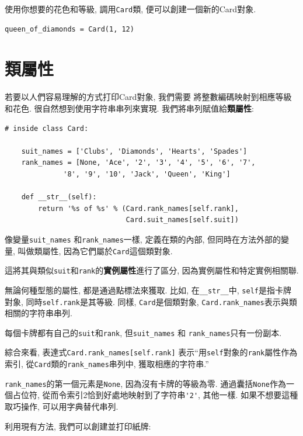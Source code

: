 \documentclass[10pt]{book}
\begin{document}
使用你想要的花色和等級, 調用{\tt Card}類, 便可以創建一個新的Card對象. 

\begin{verbatim}
queen_of_diamonds = Card(1, 12)
\end{verbatim}
%


\section{類屬性}
\label{class.attribute}

若要以人們容易理解的方式打印Card對象, 我們需要
將整數編碼映射到相應等級和花色. 
很自然想到使用字符串串列來實現. 
我們將串列賦值給{\bf 類屬性}:

\begin{verbatim}
# inside class Card:

    suit_names = ['Clubs', 'Diamonds', 'Hearts', 'Spades']
    rank_names = [None, 'Ace', '2', '3', '4', '5', '6', '7', 
              '8', '9', '10', 'Jack', 'Queen', 'King']

    def __str__(self):
        return '%s of %s' % (Card.rank_names[self.rank],
                             Card.suit_names[self.suit])
\end{verbatim}
%
像變量\verb"suit_names" 和\verb"rank_names"一樣, 
定義在類的內部, 但同時在方法外部的變量, 叫做類屬性, 
因為它們屬於{\tt Card}這個類對象. 

這將其與類似{\tt suit}和{\tt rank}的{\bf 實例屬性}進行了區分, 
因為實例屬性和特定實例相關聯. 

無論何種型態的屬性, 都是通過點標法來獲取. 
比如, 在\verb"__str__"中, {\tt self}是指卡牌對象, 
同時{\tt self.rank}是其等級. 同樣, {\tt Card}是個類對象, 
\verb"Card.rank_names"表示與類相關的字符串串列. 

每個卡牌都有自己的{\tt suit}和{\tt rank}, 
但\verb"suit_names" 和 \verb"rank_names"只有一份副本. 

綜合來看, 表達式\verb"Card.rank_names[self.rank]" 
表示``用{\tt self}對象的{\tt rank}屬性作為索引, 
從{\tt Card}類的\verb"rank_names"串列中, 獲取相應的字符串.''

\verb"rank_names"的第一個元素是{\tt None},
因為沒有卡牌的等級為零. 
通過囊括{\tt None}作為一個占位符, 
從而令索引2恰到好處地映射到了字符串\verb"'2'", 其他一樣. 
如果不想要這種取巧操作, 可以用字典替代串列. 

利用現有方法, 我們可以創建並打印紙牌:
\end{document}
